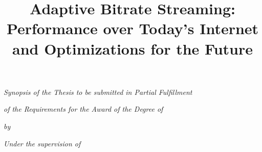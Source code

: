 \title{\fontsize{18}{18} \textbf{Adaptive Bitrate Streaming: Performance over Today's Internet and Optimizations for the Future}}

\date{{}}

\vspace{-3.0cm}

\maketitle
\thispagestyle{empty}


{\centering \fontsize{13}{13} \em Synopsis of the Thesis to be
submitted in Partial Fulfillment \par}

{\centering \fontsize{13}{13} \em of the Requirements for the
Award of the Degree of\par}


\vspace{1.0cm}

{\par}

\vspace{0.8cm}

{\centering \fontsize{13}{13} \em by\par}

\vspace{0.5cm}

{\par}

\vspace{0.25cm}

{\par}

\vspace{1.0cm}

{\centering \fontsize{13}{13} \em Under the supervision of\par}

\vspace{0.6cm}

{\par}

